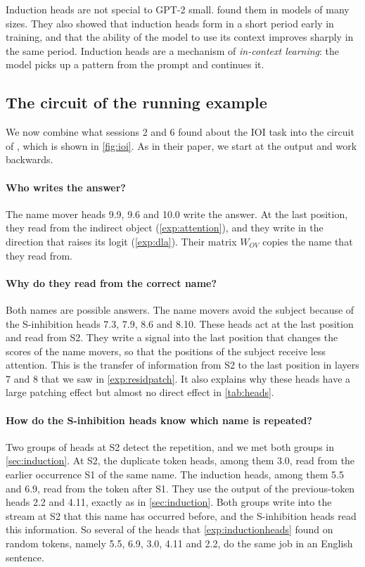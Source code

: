 Induction heads are not special to GPT-2 small. \citet{olsson2022context} found them in models of many sizes.
They also showed that induction heads form in a short period early in training, and that the ability of the model
to use its context improves sharply in the same period. Induction heads are a mechanism of \emph{in-context
learning}: the model picks up a pattern from the prompt and continues it.

\subsection{The circuit of the running example}
\label{sec:ioi}

We now combine what sessions 2 and 6 found about the IOI task into the circuit of
\citet{wang2023interpretability}, which is shown in \cref{fig:ioi}. As in their paper, we start at the output and
work backwards.

\paragraph{Who writes the answer?} The name mover heads 9.9, 9.6 and 10.0 write the answer. At the last position,
they read from the indirect object (\cref{exp:attention}), and they write in the direction that raises its logit
(\cref{exp:dla}). Their matrix $W_{OV}$ copies the name that they read from.

\paragraph{Why do they read from the correct name?} Both names are possible answers. The name movers avoid the
subject because of the S-inhibition heads 7.3, 7.9, 8.6 and 8.10. These heads act at the last position and read
from S2. They write a signal into the last position that changes the scores of the name movers, so that the
positions of the subject receive less attention. This is the transfer of information from S2 to the last position
in layers 7 and 8 that we saw in \cref{exp:residpatch}. It also explains why these heads have a large patching
effect but almost no direct effect in \cref{tab:heads}.

\paragraph{How do the S-inhibition heads know which name is repeated?} Two groups of heads at S2 detect the
repetition, and we met both groups in \cref{sec:induction}. At S2, the duplicate token heads, among them 3.0, read
from the earlier occurrence S1 of the same name. The induction heads, among them 5.5 and 6.9, read from the token
after S1. They use the output of the previous-token heads 2.2 and 4.11, exactly as in \cref{sec:induction}. Both
groups write into the stream at S2 that this name has occurred before, and the S-inhibition heads read this
information. So several of the heads that \cref{exp:inductionheads} found on random tokens, namely 5.5, 6.9, 3.0,
4.11 and 2.2, do the same job in an English sentence.

